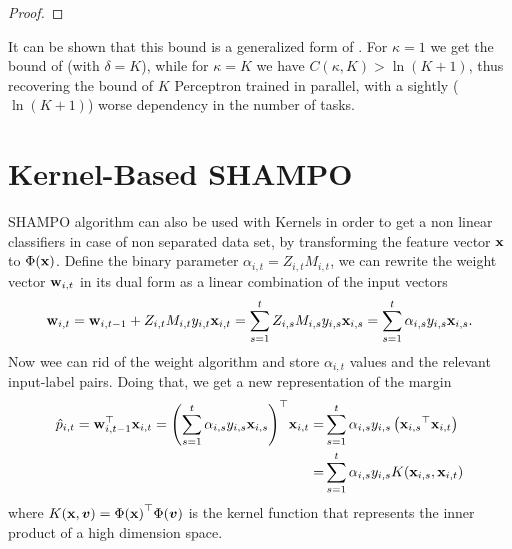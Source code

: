{\begin{proof}
 
\end{proof}

\noindent
It can be shown that this bound  is a generalized form of . 
For $\kappa=1$ we get the bound of  (with $\delta = K$), while for
$\kappa=K$ we have $C(\kappa,K)>\ln(K+1)$, thus recovering the
bound of $K$ Perceptron trained in parallel, with a sightly ($\ln(K+1)$)
worse dependency in the number of tasks.

\section{Kernel-Based SHAMPO}
SHAMPO algorithm can also be used with Kernels in order to get a non linear 
classifiers in case of non separated data set, by transforming the feature vector $\mathbf{x}$ to $\Phi(\mathbf{x})$.
Define the binary parameter $\alpha_{i,t} = Z_{i,t}M_{i,t}$, we can rewrite the weight vector $\mathbf{w}_{i,t}$ in its 
dual form as a linear combination of the input vectors
\[
\mathbf{w}_{i,t} = \mathbf{w}_{i,t-1}+Z_{i,t}M_{i,t}y_{i,t}\mathbf{x}_{i,t} =\sum_{s=1}^t{Z_{i,s}M_{i,s}y_{i,s}\mathbf{x}_{i,s}} 
= \sum_{s=1}^t{\alpha_{i,s}y_{i,s}\mathbf{x}_{i,s}}.
\]
Now wee can rid of the weight algorithm and store $\alpha_{i,t}$ values and the relevant input-label pairs. 
Doing that, we get a new representation of the margin
\begin{equation*}
\begin{split}
\hat{p}_{i,t}={\mathbf{w}}^{\top}_{i,t-1} \mathbf{x}_{i,t}
= {\left({\sum_{s=1}^t{\alpha_{i,s}y_{i,s}\mathbf{x}_{i,s}}}\right)}^{\top}\mathbf{x}_{i,t} 
= &\sum_{s=1}^t{\alpha_{i,s}y_{i,s}\left({{\mathbf{x}_{i,s}}^{\top}\mathbf{x}_{i,t}}\right)}\\
=&\sum_{s=1}^t{\alpha_{i,s}y_{i,s}K(\mathbf{x}_{i,s},\mathbf{x}_{i,t})}
\end{split}
\end{equation*}
where $K(\mathbf{x},{\boldsymbol{v}})  = {\Phi(\mathbf{x})}^{\top}\Phi({\boldsymbol{v}})$ is the kernel function that represents the inner product of 
a high dimension space. 

}
